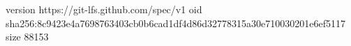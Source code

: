 version https://git-lfs.github.com/spec/v1
oid sha256:8c9423e4a7698763403cb0b6cad1df4d86d32778315a30e710030201e6ef5117
size 88153
